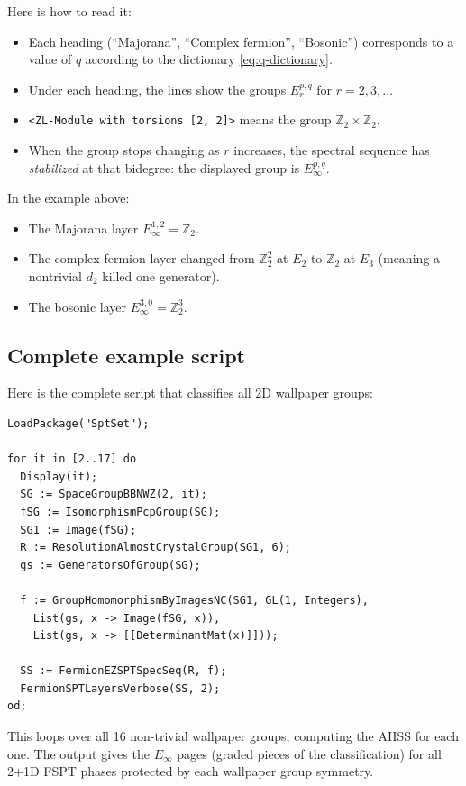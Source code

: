 \documentclass{SciPost}
\theoremstyle{definition}
\newcommand{\Zt}{\mathbb{Z}_2}
\begin{document}
Here is how to read it:
\begin{itemize}
    \item Each heading (``Majorana'', ``Complex fermion'', ``Bosonic'') corresponds to a value of $q$ according to the dictionary \eqref{eq:q-dictionary}.
    \item Under each heading, the lines show the groups $E_r^{p,q}$ for $r = 2, 3, \ldots$
    \item \texttt{<ZL-Module with torsions [2, 2]>} means the group $\Zt \times \Zt$.
    \item When the group stops changing as $r$ increases, the spectral sequence has \emph{stabilized} at that bidegree: the displayed group is $E_\infty^{p,q}$.
\end{itemize}

In the example above:
\begin{itemize}
    \item The Majorana layer $E_\infty^{1,2} = \Zt$.
    \item The complex fermion layer changed from $\Zt^2$ at $E_2$ to $\Zt$ at $E_3$ (meaning a nontrivial $d_2$ killed one generator).
    \item The bosonic layer $E_\infty^{3,0} = \Zt^3$.
\end{itemize}

\subsection{Complete example script}
\label{subsec:complete-script}

Here is the complete script that classifies all 2D wallpaper groups:
\begin{verbatim}
LoadPackage("SptSet");

for it in [2..17] do
  Display(it);
  SG := SpaceGroupBBNWZ(2, it);
  fSG := IsomorphismPcpGroup(SG);
  SG1 := Image(fSG);
  R := ResolutionAlmostCrystalGroup(SG1, 6);
  gs := GeneratorsOfGroup(SG);

  f := GroupHomomorphismByImagesNC(SG1, GL(1, Integers),
    List(gs, x -> Image(fSG, x)),
    List(gs, x -> [[DeterminantMat(x)]]));

  SS := FermionEZSPTSpecSeq(R, f);
  FermionSPTLayersVerbose(SS, 2);
od;
\end{verbatim}
This loops over all 16 non-trivial wallpaper groups, computing the AHSS for each one.
The output gives the $E_\infty$ pages (graded pieces of the classification) for all 2+1D FSPT phases protected by each wallpaper group symmetry.
\end{document}
